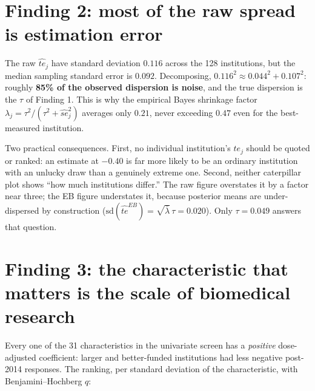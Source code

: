 \documentclass[11pt]{article}
\begin{document}
\section{Finding 2: most of the raw spread is estimation error}

The raw $\widehat{te}_j$ have standard deviation $0.116$ across the 128
institutions, but the median sampling standard error is $0.092$. Decomposing,
$0.116^2 \approx 0.044^2 + 0.107^2$: roughly \textbf{85\% of the observed
dispersion is noise}, and the true dispersion is the $\tau$ of Finding 1.
This is why the empirical Bayes shrinkage factor
$\lambda_j = \tau^2/(\tau^2 + \widehat{se}_j^2)$ averages only $0.21$,
never exceeding $0.47$ even for the best-measured institution.

Two practical consequences. First, no individual institution's $te_j$ should
be quoted or ranked: an estimate at $-0.40$ is far more likely to be an
ordinary institution with an unlucky draw than a genuinely extreme one.
Second, neither caterpillar plot shows ``how much institutions differ.'' The
raw figure overstates it by a factor near three; the EB figure understates
it, because posterior means are under-dispersed by construction
($\mathrm{sd}(\widehat{te}^{EB}) = \sqrt{\bar\lambda}\,\tau = 0.020$). Only
$\tau = 0.049$ answers that question.

\section{Finding 3: the characteristic that matters is the scale of biomedical research}

Every one of the 31 characteristics in the univariate screen has a
\emph{positive} dose-adjusted coefficient: larger and better-funded
institutions had less negative post-2014 responses. The ranking, per standard
deviation of the characteristic, with Benjamini--Hochberg $q$:
\end{document}
